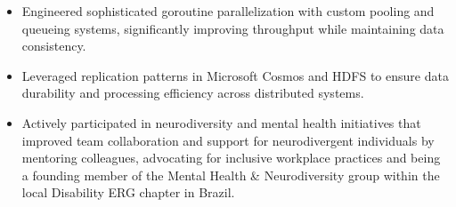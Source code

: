 \begin{itemize}
    \item \scriptsize{Engineered sophisticated goroutine parallelization with custom pooling and 
        queueing systems, significantly improving throughput while maintaining data consistency.}
        
    \item \scriptsize{Leveraged replication patterns in Microsoft Cosmos and HDFS to ensure data 
        durability and processing efficiency across distributed systems.}

    \item \scriptsize{Actively participated in neurodiversity and mental health initiatives that
        improved team collaboration and support for neurodivergent individuals by mentoring colleagues,
        advocating for inclusive workplace practices and being a founding member of the Mental Health \&
        Neurodiversity group within the local Disability ERG chapter in Brazil.}
\end{itemize}